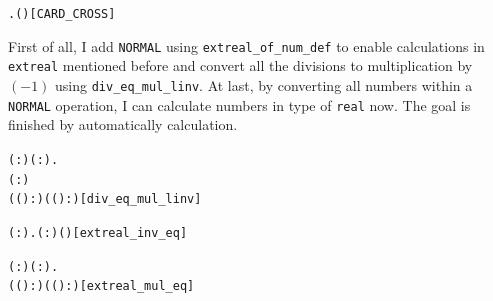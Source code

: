 \documentclass{article}
\begin{document}
\begin{alltt}
\HOLTokenTurnstile{} \HOLSymConst{\HOLTokenForall{}} .   \HOLSymConst{\HOLTokenConj{}}   \HOLSymConst{\HOLTokenImp{}}  ( \HOLSymConst{\ensuremath{\times}} ) \HOLSymConst{=}   \HOLSymConst{\HOLTokenProd{}}  \hfill{[CARD_CROSS]}
\end{alltt}

First of all, I add \verb|NORMAL| using \verb|extreal_of_num_def| to enable calculations in \verb|extreal| mentioned before
and convert all the divisions to multiplication by $(-1)$ using \verb|div_eq_mul_linv|. At last, by converting all numbers within a
\verb|NORMAL| operation, I can calculate numbers in type of \verb|real| now. The goal is finished by automatically calculation.

\begin{alltt}
\HOLTokenTurnstile{} \HOLSymConst{\HOLTokenForall{}}( :) ( :).
      \HOLSymConst{\HOLTokenNotEqual{}} \HOLSymConst{\ensuremath{+\infty}} \HOLSymConst{\HOLTokenConj{}}  \HOLSymConst{\HOLTokenNotEqual{}} \HOLSymConst{\ensuremath{-\infty}} \HOLSymConst{\HOLTokenConj{}} ( :) \HOLSymConst{\HOLTokenLt{}}  \HOLSymConst{\HOLTokenImp{}}
     (( \HOLSymConst{/} ) :) \HOLSymConst{=} ((\HOLSymConst{\HOLTokenInverse{}} \HOLSymConst{\HOLTokenProd{}} ) :)\hfill{[div_eq_mul_linv]}
\end{alltt}

\begin{alltt}
\HOLTokenTurnstile{} \HOLSymConst{\HOLTokenForall{}}( :).  \HOLSymConst{\HOLTokenNotEqual{}} ( :) \HOLSymConst{\HOLTokenImp{}} ( )\HOLSymConst{\HOLTokenInverse{}} \HOLSymConst{=}  \HOLSymConst{\HOLTokenInverse{}}\hfill{[extreal_inv_eq]}
\end{alltt}

\begin{alltt}
\HOLTokenTurnstile{} \HOLSymConst{\HOLTokenForall{}}( :) ( :).
     ((  \HOLSymConst{\HOLTokenProd{}}  ) :) \HOLSymConst{=}  (( \HOLSymConst{\HOLTokenProd{}} ) :)\hfill{[extreal_mul_eq]}
\end{alltt}
\end{document}
